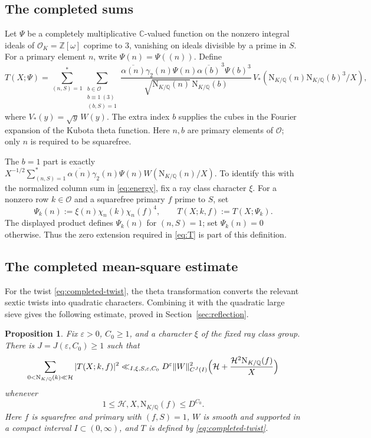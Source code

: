 \documentclass[11pt,a4paper]{article}
\numberwithin{equation}{section}
\numberwithin{figure}{section}
\newtheorem{proposition}[theorem]{Proposition}
\theoremstyle{definition}
\theoremstyle{remark}
\newcommand{\Q}{\mathbb Q}
\newcommand{\NK}{\mathrm N_{K/\Q}}
\newcommand{\OO}{\mathcal O}
\begin{document}
\subsection{The completed sums}
Let $\Psi$ be a completely multiplicative $\mathbb C$-valued function on the
nonzero integral ideals of $\OO_K=\mathbb Z[\omega]$ coprime to $3$, vanishing on ideals divisible by a prime in $S$. 
For a primary element $n$, write $\Psi(n)=\Psi((n))$.
Define
\begin{equation}\label{eq:T}
 T(X;\Psi)=
 \sum_{(n,S)=1}^*\sum_{\substack{b\in\OO\\b\equiv1\ (3)\\(b,S)=1}}
 \frac{\overline{\alpha(n)}\gamma_2(n)\Psi(n)
       \overline{\alpha(b)}^{\,3}\Psi(b)^3}
      {\sqrt{\NK(n)}\,\NK(b)}\,V_*(\NK(n)\NK(b)^3/X),
\end{equation}
where $V_*(y)=\sqrt y\,W(y)$. The extra index $b$ supplies the cubes in the Fourier expansion of the
Kubota theta function.
Here $n,b$ are primary elements of $\OO$; only $n$ is required to be
squarefree.

The $b=1$ part is exactly
$X^{-1/2}\sum_{(n,S)=1}^*\overline{\alpha(n)}\gamma_2(n)\Psi(n)W(\NK(n)/X)$.
To identify this with the normalized column sum in \eqref{eq:energy},
fix a ray class character $\xi$. For a nonzero row $k\in\OO$ and a
squarefree primary $f$ prime to $S$, set
\begin{equation}\label{eq:completed-twist}
 \Psi_k(n):=\xi(n)\chi_n(k)\chi_n(f)^4,
 \qquad T(X;k,f):=T(X;\Psi_k).
\end{equation}
The displayed product defines $\Psi_k(n)$ for $(n,S)=1$; set $\Psi_k(n)=0$ otherwise. Thus the zero extension required in \eqref{eq:T} is part of this definition.


\subsection{The completed mean-square estimate}
For the twist \eqref{eq:completed-twist}, the theta transformation converts
the relevant sextic twists into quadratic characters. Combining it with
the quadratic large sieve gives the following estimate, proved in
Section~\ref{sec:reflection}.

\begin{proposition}\label{prop:R}
Fix $\varepsilon>0$, $C_0\ge1$, and a character $\xi$ of the fixed ray
class group. There is $J=J(\varepsilon,C_0)\ge1$ such that
\begin{equation}\label{eq:R}
 \sum_{0<\NK(k)\ll\mathcal H}|T(X;k,f)|^2
 \ll_{I,\xi,S,\varepsilon,C_0}
 D^\varepsilon\|W\|_{C^J(I)}^2
 \Bigl(\mathcal H+\frac{\mathcal H^2\NK(f)}{X}\Bigr)
\end{equation}
whenever
\[
 1\le\mathcal H,X,\NK(f)\le D^{C_0}.
\]
Here $f$ is squarefree and primary with $(f,S)=1$,
$W$ is smooth and supported in a compact interval $I\subset(0,\infty)$,
and $T$ is defined by \eqref{eq:completed-twist}.
\end{proposition}
\end{document}
